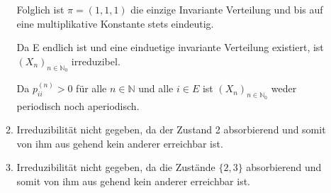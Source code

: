 \documentclass[a4paper]{scrartcl}
\newcommand{\N}{\mathbb{N}}
\def \blattnr {3}
\begin{document}
\begin{enumerate}[label=\bfseries \blattnr.\arabic*]
\begin{enumerate}
      Folglich ist $\pi = (1,1,1)$ die einzige Invariante Verteilung und bis auf eine multiplikative Konstante stets eindeutig.
      
      Da E endlich ist und eine einduetige invariante Verteilung existiert, ist $(X_n)_{n\in\N_0}$ irreduzibel.

      Da $p_{ii}^{(n)} > 0$ für alle $n \in \N$ und alle $i \in E$ ist $(X_n)_{n\in\N_0}$ weder periodisch noch aperiodisch.
	
	
      \item
	Irreduzibilität nicht gegeben, da der Zustand 2 absorbierend 
	und somit von ihm aus gehend kein anderer erreichbar ist. 
	
      \item
	Irreduzibilität nicht gegeben, da die Zustände $\{2,3\}$ absorbierend 
	und somit von ihm aus gehend kein anderer erreichbar ist. 
     \end{enumerate}


\end{enumerate}
\end{document}
